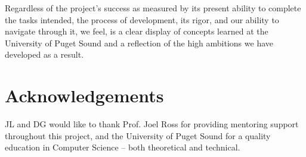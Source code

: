 \documentclass{acm_proc_article-sp}
\begin{document}
Regardless of the project's success as measured by its present ability to complete the tasks intended, the process of development, its rigor, and our ability to navigate through it, we feel, is a clear display of concepts learned at the University of Puget Sound and a reflection of the high ambitions we have developed as a result.

\section{Acknowledgements}
JL and DG would like to thank Prof. Joel Ross for providing mentoring support throughout this project, and the University of Puget Sound for a quality education in Computer Science -- both theoretical and technical.



  
%
%


\balancecolumns

\end{document}
